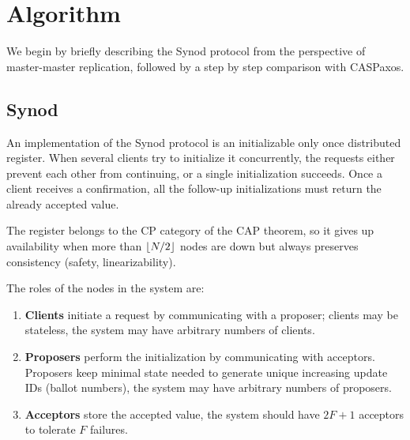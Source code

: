 \documentclass[12pt]{article}
\theoremstyle{definition}
\DeclarePairedDelimiter{\floor}{\lfloor}{\rfloor}
\begin{document}
\section{Algorithm}

We begin by briefly describing the Synod protocol from the perspective of master-master replication, followed by a step by step comparison with CASPaxos.

\subsection{Synod}

An implementation of the Synod protocol is an initializable only once distributed register. When several clients try to initialize it concurrently, the requests either prevent each other from continuing, or a single initialization succeeds. Once a client receives a confirmation, all the follow-up initializations must return the already accepted value.

The register belongs to the CP category of the CAP theorem, so it gives up availability when more than $\floor{N/2}$ nodes are down but always preserves consistency (safety, linearizability).

The roles of the nodes in the system are:
\begin{enumerate}
  \item {\bf Clients} initiate a request by communicating with a proposer; clients may be stateless, the system may have arbitrary numbers of clients.
  \item {\bf Proposers} perform the initialization by communicating with acceptors. Proposers keep minimal state needed to generate unique increasing update IDs (ballot numbers), the system may have arbitrary numbers of proposers.
  \item {\bf Acceptors} store the accepted value, the system should have $2F+1$ acceptors to tolerate $F$ failures.
\end{enumerate}
\end{document}
